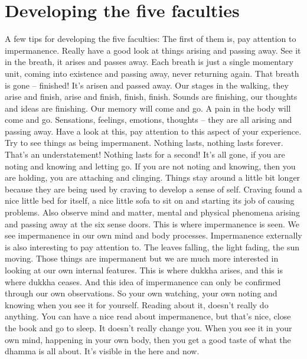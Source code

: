 \documentclass[letterpaper,10pt,english]{sphinxmanual}
\begin{document}
\section{Developing the five faculties}
\label{\detokenize{5-a:developing-the-five-faculties}}
\sphinxAtStartPar
A few tips for developing the five faculties: The first of them is, pay
attention  to  impermanence.  Really  have  a  good  look  at  things  arising  and
passing  away.  See  it  in  the  breath,  it  arises  and  passes  away.  Each  breath
is  just  a  single  momentary  unit,  coming  into  existence  and  passing  away,
never returning again. That breath is gone – finished! It’s arisen and passed
  away.  Our  stages  in  the  walking,  they  arise  and  finish,  arise  and  finish,
finish, finish. Sounds are finishing, our thoughts and ideas are finishing. Our
memory will come and go. A pain in the body will come and go. Sensations,
feelings, emotions, thoughts – they are all arising and passing away. Have
a  look  at  this,  pay  attention  to  this  aspect  of  your  experience.  Try  to  see
things as being impermanent. Nothing lasts, nothing lasts forever. That’s an
understatement! Nothing lasts for a second! It’s all gone, if you are noting
and knowing and letting go. If you are not noting and knowing, then you are
holding, you are attaching and clinging. Things stay around a little bit longer
because they are being used by craving to develop a sense of self. Craving
found a nice little bed for itself, a nice little sofa to sit on and starting its job
of  causing  problems. Also  observe  mind  and  matter,  mental  and  physical
phenomena arising and passing away at the six sense doors. This is where
impermanence  is  seen.  We  see  impermanence  in  our  own  mind  and  body
processes. Impermanence externally is also interesting to pay attention to.
The leaves falling, the light fading, the sun moving. Those things are impermanent but we are much more interested in looking at our own internal features. This is where dukkha arises, and this is where dukkha ceases. And this
idea of impermanence can only be confirmed through our own observations.
So your own watching, your own noting and knowing when you see it for
yourself. Reading about it, doesn’t really do anything. You can have a nice
read about impermanence, but that’s nice, close the book and go to sleep. It
doesn’t really change you. When you see it in your own mind, happening in
your own body, then you get a good taste of what the dhamma is all about.
It’s visible in the here and now.
\end{document}
